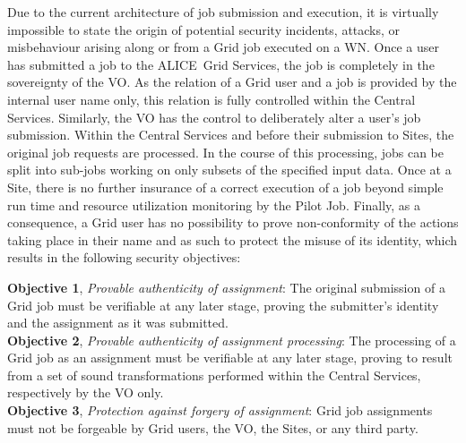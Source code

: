\documentclass[10pt]{iopart}
\newcommand{\alice}{ALICE}
\begin{document}
Due to the current architecture of job submission and execution, it is
virtually impossible to state the origin of potential security incidents,
attacks, or misbehaviour arising along or from a Grid job executed on a WN.
Once a user has submitted a job to the \alice\ Grid Services, the job is
completely in the sovereignty of the VO. As the relation of a Grid user and a
job is provided by the internal user name only, this relation is fully
controlled within the Central Services. Similarly, the VO has the control to deliberately
alter a user's job submission. Within the Central
Services and before their submission to Sites, the original job requests are
processed. In the course of this processing, jobs can be split into sub-jobs
working on only subsets of the specified input data. Once at a Site, there is
no further insurance of a correct execution of a job beyond simple run time and
resource utilization monitoring by the Pilot Job. Finally, as a consequence, a
Grid user has no possibility to prove non-conformity of the actions taking place 
in their name and as such to protect the misuse of its identity, which results
in the following security objectives:\\
\par
\begingroup
\leftskip=0.4cm
\noindent
\textbf{Objective 1}, \textit{Provable authenticity of assignment}:
The original submission of a Grid job must be verifiable at any later stage,
proving the submitter's identity and the assignment as it was submitted.\\

\noindent
\textbf{Objective 2}, \textit{Provable authenticity of assignment processing}:
The processing of a Grid job as an assignment must be
verifiable at any later stage, proving to result from a set of sound
transformations performed within the Central Services, respectively by the VO
only.\\

\noindent
\textbf{Objective 3}, \textit{Protection against forgery of assignment}: 
Grid job assignments must not be forgeable by Grid users, the VO, the Sites, or
any third party.\\
\end{document}
